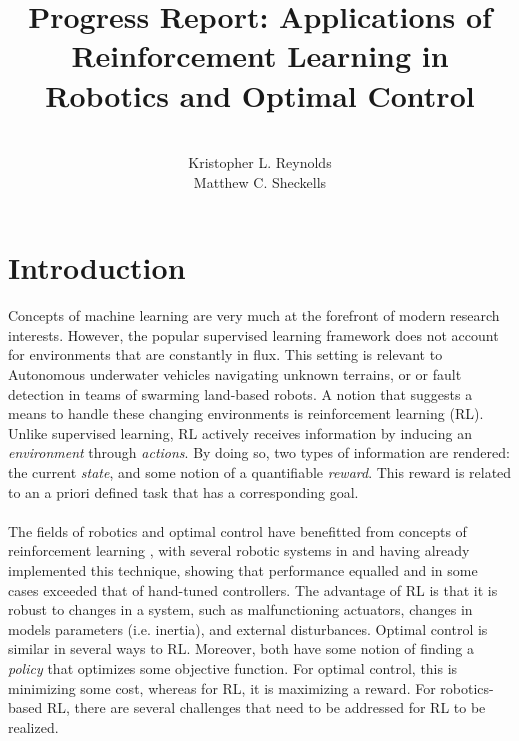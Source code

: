 \documentclass[10pt]{article}
\begin{document}
\title{Progress Report: Applications of Reinforcement Learning in Robotics and Optimal Control}%
\author{\\ %
Kristopher L. Reynolds\\
Matthew C. Sheckells
\\} %
\maketitle
\section{Introduction}
Concepts of machine learning are very much at the forefront of modern research interests. However, the popular supervised learning framework does not account for environments that are constantly in flux. This setting is relevant to Autonomous underwater vehicles navigating unknown terrains, or or fault detection in teams of swarming land-based robots. A notion that suggests a means to handle these changing environments is reinforcement learning (RL). Unlike supervised learning, RL actively receives information by inducing an \textit{environment} through \textit{actions}. By doing so, two types of information are rendered: the current \textit{state}, and some notion of a quantifiable \textit{reward}. This reward is related to an a priori defined task that has a corresponding goal. 
\\
\\
The fields of robotics and optimal control have benefitted from concepts of reinforcement learning\cite{kober_reinforcement_2013} \cite{kaelbling_reinforcement_1996}, with several robotic systems in  \cite{bhasin_reinforcement_2011} and \cite{hester_rtmba:_2012} having already implemented this technique, showing that performance equalled and in some cases exceeded that of hand-tuned controllers. The advantage of RL is that it is robust to changes in a system, such as malfunctioning actuators, changes in models parameters (i.e. inertia), and external disturbances. Optimal control is similar in several ways to RL. Moreover, both have some notion of finding a \textit{policy} that optimizes some objective function. For optimal control, this is minimizing some cost, whereas for RL, it is maximizing a reward. For robotics-based RL, there are several challenges that need to be addressed for RL to be realized.
\end{document}

